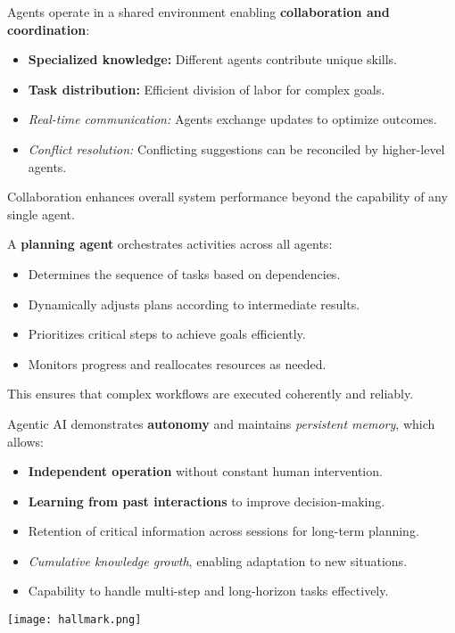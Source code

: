 \documentclass[a4paper, 12pt]{article}
\begin{document}
\begin{tcolorbox}[title={3. Collaborative Agent Environment}, colback=orange!5!white, colframe=orange!75!black]
Agents operate in a shared environment enabling \textbf{collaboration and coordination}:  
\begin{itemize}
    \item \textbf{Specialized knowledge:} Different agents contribute unique skills.
    \item \textbf{Task distribution:} Efficient division of labor for complex goals.
    \item \textit{Real-time communication:} Agents exchange updates to optimize outcomes.
    \item \textit{Conflict resolution:} Conflicting suggestions can be reconciled by higher-level agents.
\end{itemize}
Collaboration enhances overall system performance beyond the capability of any single agent.
\end{tcolorbox}
\vspace{0.5cm}

\begin{tcolorbox}[title={4. Planning and Coordination Agent}, colback=red!5!white, colframe=red!75!black]
A \textbf{planning agent} orchestrates activities across all agents:  
\begin{itemize}
    \item Determines the sequence of tasks based on dependencies.
    \item Dynamically adjusts plans according to intermediate results.
    \item Prioritizes critical steps to achieve goals efficiently.
    \item Monitors progress and reallocates resources as needed.
\end{itemize}
This ensures that complex workflows are executed coherently and reliably.
\end{tcolorbox}
\vspace{0.5cm}

\begin{tcolorbox}[title={5. Autonomy and Persistent Memory}, colback=purple!5!white, colframe=purple!75!black]
Agentic AI demonstrates \textbf{autonomy} and maintains \textit{persistent memory}, which allows:  
\begin{itemize}
    \item \textbf{Independent operation} without constant human intervention.
    \item \textbf{Learning from past interactions} to improve decision-making.
    \item Retention of critical information across sessions for long-term planning.
    \item \textit{Cumulative knowledge growth}, enabling adaptation to new situations.
    \item Capability to handle multi-step and long-horizon tasks effectively.
\end{itemize}
\end{tcolorbox}
\vspace{1cm}
\texttt{[image: hallmark.png]}
\end{document}

